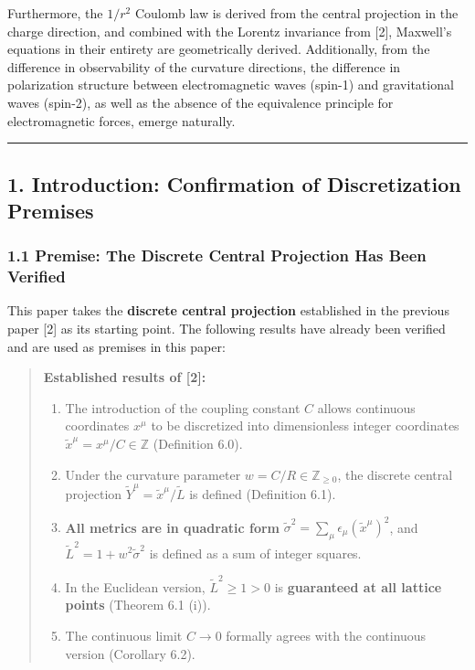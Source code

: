 \documentclass[a4paper,11pt]{article}
\theoremstyle{definition}
\begin{document}
Furthermore, the \(1/r^2\) Coulomb law is derived from the central projection in the charge direction, and combined with the Lorentz invariance from {[}2{]}, Maxwell's equations in their entirety are geometrically derived. Additionally, from the difference in observability of the curvature directions, the difference in polarization structure between electromagnetic waves (spin-1) and gravitational waves (spin-2), as well as the absence of the equivalence principle for electromagnetic forces, emerge naturally.

\begin{center}\rule{0.5\linewidth}{0.5pt}\end{center}

\subsection{1. Introduction: Confirmation of Discretization Premises}\label{introduction-confirmation-of-discretization-premises}

\subsubsection{1.1 Premise: The Discrete Central Projection Has Been Verified}\label{premise-the-discrete-central-projection-has-been-verified}

This paper takes the \textbf{discrete central projection} established in the previous paper {[}2{]} as its starting point. The following results have already been verified and are used as premises in this paper:

\begin{quote}
\textbf{Established results of {[}2{]}:}

\begin{enumerate}
\def\labelenumi{\arabic{enumi}.}
\tightlist
\item
  The introduction of the coupling constant \(C\) allows continuous coordinates \(x^\mu\) to be discretized into dimensionless integer coordinates \(\tilde{x}^\mu = x^\mu/C \in \mathbb{Z}\) (Definition 6.0).
\item
  Under the curvature parameter \(w = C/R \in \mathbb{Z}_{\geq 0}\), the discrete central projection \(\tilde{Y}^\mu = \tilde{x}^\mu / \tilde{L}\) is defined (Definition 6.1).
\item
  \textbf{All metrics are in quadratic form} \(\tilde{\sigma}^2 = \sum_\mu \epsilon_\mu (\tilde{x}^\mu)^2\), and \(\tilde{L}^2 = 1 + w^2 \tilde{\sigma}^2\) is defined as a sum of integer squares.
\item
  In the Euclidean version, \(\tilde{L}^2 \geq 1 > 0\) is \textbf{guaranteed at all lattice points} (Theorem 6.1 (i)).
\item
  The continuous limit \(C \to 0\) formally agrees with the continuous version (Corollary 6.2).
\end{enumerate}
\end{quote}
\end{document}
